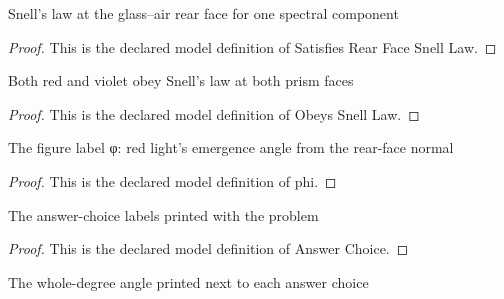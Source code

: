 \begin{definition}
  \label{def:physics:phyx-mini-0073:phyxminiproblems-problemphyxmini0073-satisfiesrearfacesnelllaw}
  Snell's law at the glass--air rear face for one spectral component
\end{definition}
\begin{proof}
  This is the declared model definition of Satisfies Rear Face Snell Law.
\end{proof}
\begin{definition}
  \label{def:physics:phyx-mini-0073:phyxminiproblems-problemphyxmini0073-obeyssnelllaw}
  Both red and violet obey Snell's law at both prism faces
\end{definition}
\begin{proof}
  This is the declared model definition of Obeys Snell Law.
\end{proof}
\begin{definition}[phi]
  \label{def:physics:phyx-mini-0073:phyxminiproblems-problemphyxmini0073-phi}
  The figure label φ: red light's emergence angle from the rear-face normal
\end{definition}
\begin{proof}
  This is the declared model definition of phi.
\end{proof}
\begin{definition}
  \label{def:physics:phyx-mini-0073:phyxminiproblems-problemphyxmini0073-answerchoice}
  The answer-choice labels printed with the problem
\end{definition}
\begin{proof}
  This is the declared model definition of Answer Choice.
\end{proof}
\begin{definition}
  \label{def:physics:phyx-mini-0073:phyxminiproblems-problemphyxmini0073-answerchoice-angledegrees}
  The whole-degree angle printed next to each answer choice
\end{definition}
